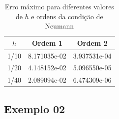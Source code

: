 \documentclass[column,amsmath,amssymb,floatfix]{revtex4}
\begin{document}
\begin{table}[H]
   \centering
   \caption{Erro máximo para diferentes valores de $h$ e ordens da condição de Neumann}
   \label{tab:erro_neumann}
   \renewcommand{\arraystretch}{1.25}
   \setlength{\tabcolsep}{12pt}
   \begin{tabular}{|c|c|c|}
       \hline
       \textbf{$h$} & \textbf{Ordem 1} & \textbf{Ordem 2} \\ \hline
       1/10 & 8.171035e-02 & 3.937531e-04 \\ \hline
       1/20 & 4.148152e-02 & 5.096550e-05 \\ \hline
       1/40 & 2.089094e-02 & 6.474309e-06 \\ \hline
   \end{tabular}
\end{table}

\subsection{Exemplo 02}
\end{document}
